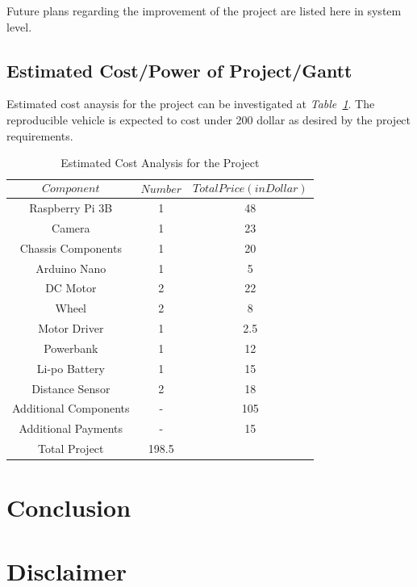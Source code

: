 \documentclass[a4paper,12pt]{article}
\begin{document}
	Future plans regarding the improvement of the project are listed here in system level.
	
	
	\subsection{Estimated Cost/Power of Project/Gantt}
		Estimated cost anaysis for the project can be investigated at \textit{Table~\ref{tab:cost}}. The reproducible vehicle is expected to cost under 200 dollar as desired by the project requirements.
	
	\begin{table}[H]
  \centering
 	
 	\caption{Estimated Cost Analysis for the Project}
    \begin{tabular}{c|c|c}
       $$Component$$ & $$Number$$ & $$Total Price (in Dollar)$$  \\ \hline
       Raspberry Pi 3B & 1 & 48   \\ \hline
       Camera & 1 & 23   \\ \hline
       Chassis Components & 1 & 20   \\ \hline
       Arduino Nano & 1 &  5 \\ \hline
       DC Motor & 2 & 22 \\ \hline
       Wheel & 2 & 8 \\ \hline
       Motor Driver & 1 &  2.5 \\ \hline
       Powerbank & 1 & 12 \\ \hline
       Li-po Battery  & 1 & 15 \\ \hline
       Distance Sensor & 2 & 18 \\ \hline
       
		Additional Components & - & 105 \\ \hline
       Additional Payments & - & 15 \\ \hline
       Total Project &  198.5 
         
  
  \end{tabular} 
  \label{tab:cost}
  
\end{table}
		
		\newpage
	
	\section{Conclusion}
	
	\newpage
		\section{Disclaimer}
		\vspace{1cm}
		
\end{document}
